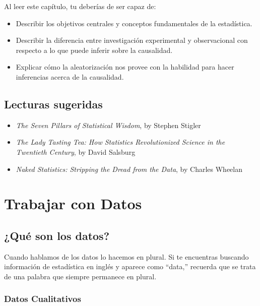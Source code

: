 \documentclass[
  12pt,
]{book}
\providecommand{\tightlist}{%
  \setlength{\itemsep}{0pt}\setlength{\parskip}{0pt}}
\theoremstyle{definition}
\theoremstyle{definition}
\theoremstyle{definition}
\theoremstyle{remark}
\begin{document}
Al leer este capítulo, tu deberías de ser capaz de:

\begin{itemize}
\tightlist
\item
  Describir los objetivos centrales y conceptos fundamentales de la estadística.
\item
  Describir la diferencia entre investigación experimental y observacional con respecto a lo que puede inferir sobre la causalidad.
\item
  Explicar cómo la aleatorización nos provee con la habilidad para hacer inferencias acerca de la causalidad.
\end{itemize}

\hypertarget{lecturas-sugeridas}{%
\section{Lecturas sugeridas}\label{lecturas-sugeridas}}

\begin{itemize}
\tightlist
\item
  \emph{The Seven Pillars of Statistical Wisdom}, by Stephen Stigler
\item
  \emph{The Lady Tasting Tea: How Statistics Revolutionized Science in the Twentieth Century}, by David Salsburg
\item
  \emph{Naked Statistics: Stripping the Dread from the Data}, by Charles Wheelan
\end{itemize}

\hypertarget{trabajar-con-datos}{%
\chapter{Trabajar con Datos}\label{trabajar-con-datos}}

\hypertarget{quuxe9-son-los-datos}{%
\section{¿Qué son los datos?}\label{quuxe9-son-los-datos}}

Cuando hablamos de los datos lo hacemos en plural. Si te encuentras buscando información de estadística en inglés y aparece como ``data,'' recuerda que se trata de una palabra que siempre permanece en plural.

\hypertarget{datos-cualitativos}{%
\subsection{Datos Cualitativos}\label{datos-cualitativos}}
\end{document}
